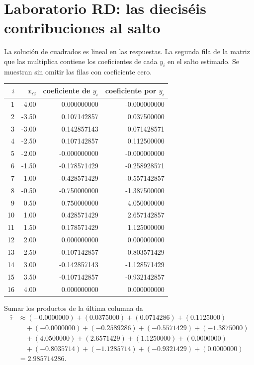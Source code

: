 \documentclass[11pt,a4paper]{article}
\begin{document}
\clearpage
\section{Laboratorio RD: las dieciséis contribuciones al salto}\label{unidad54}
La solución de cuadrados es lineal en las respuestas.
La segunda fila de la matriz que las multiplica
contiene los coeficientes de cada \(y_i\)
en el salto estimado. Se muestran sin omitir
las filas con coeficiente cero.
\begin{center}\small\begin{tabular}{rrrr}\toprule
\(i\)&\(x_{i2}\)&coeficiente de \(y_i\)&coeficiente por \(y_i\)\\\midrule
1&-4.00&0.000000000&-0.000000000\\
2&-3.50&0.107142857&0.037500000\\
3&-3.00&0.142857143&0.071428571\\
4&-2.50&0.107142857&0.112500000\\
5&-2.00&-0.000000000&-0.000000000\\
6&-1.50&-0.178571429&-0.258928571\\
7&-1.00&-0.428571429&-0.557142857\\
8&-0.50&-0.750000000&-1.387500000\\
9&0.50&0.750000000&4.050000000\\
10&1.00&0.428571429&2.657142857\\
11&1.50&0.178571429&1.125000000\\
12&2.00&0.000000000&0.000000000\\
13&2.50&-0.107142857&-0.803571429\\
14&3.00&-0.142857143&-1.128571429\\
15&3.50&-0.107142857&-0.932142857\\
16&4.00&0.000000000&0.000000000\\\bottomrule\end{tabular}\end{center}
Sumar los productos de la última columna da
\[
\begin{aligned}
\widehat\tau&\approx(-0.0000000)+(0.0375000)+(0.0714286)+(0.1125000)\\&\quad+(-0.0000000)+(-0.2589286)+(-0.5571429)+(-1.3875000)\\&\quad+(4.0500000)+(2.6571429)+(1.1250000)+(0.0000000)\\&\quad+(-0.8035714)+(-1.1285714)+(-0.9321429)+(0.0000000)\\&=2.985714286.\end{aligned}
\]
\end{document}
